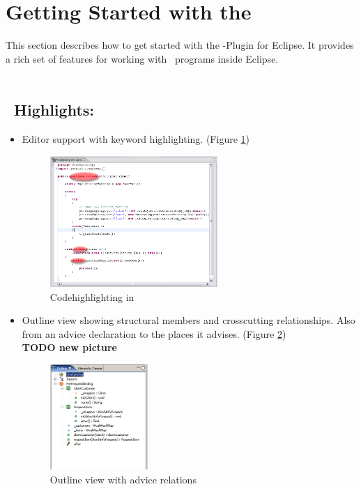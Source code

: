 \section{Getting Started with the \cjdt}
This section describes how to get started with the \cjdt -Plugin for Eclipse. It provides a rich set of features for working with \caesarj ~programs inside Eclipse.\\\\
\subsection{\cjdt ~Highlights:}
\begin{itemize}
	\item Editor support with keyword highlighting. (Figure \ref{fig:hilight})
	
\begin{figure}[htbp]
	\centering
		\includegraphics[width=0.60\textwidth]{images/hilight.png}
	\caption{Codehighlighting in \cjdt}
	\label{fig:hilight}
\end{figure}

  \item Outline view showing structural members and crosscutting relationships. Also from an advice declaration to the places it advises. (Figure \ref{fig:outline})\\ \textbf{TODO new picture}

\begin{figure}[htbp]
	\centering
		\includegraphics[width=0.35\textwidth]{images/outline.png}
	\caption{Outline view with advice relations}
	\label{fig:outline}
\end{figure}


\end{itemize}
